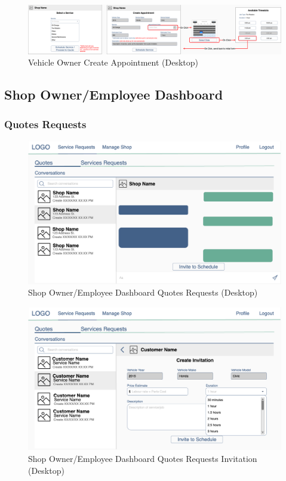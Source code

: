 \documentclass[12pt, titlepage]{article}
\begin{document}
\begin{figure}[H]
	\centering
	\includegraphics[width=\textwidth]{mockups/Vehicle Owner - Create Appointment Popup (Desktop).png}
	\caption{Vehicle Owner Create Appointment (Desktop)}
\end{figure}

\subsection{Shop Owner/Employee Dashboard}
\subsubsection{Quotes Requests}

\begin{figure}[H]
	\centering
	\includegraphics[width=\textwidth]{mockups/Shop Owner Dashboard (Quotes Requests) (Desktop).png}
	\caption{Shop Owner/Employee Dashboard \textemdash{} Quotes Requests (Desktop)}
\end{figure}

\begin{figure}[H]
	\centering
	\includegraphics[width=\textwidth]{mockups/Shop Owner Dashboard (Quotes Requests - Invitation) (Desktop).png}
	\caption{Shop Owner/Employee Dashboard \textemdash{} Quotes Requests \textemdash{} Invitation (Desktop)}
\end{figure}
\end{document}
